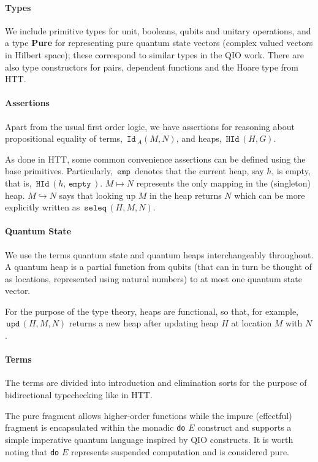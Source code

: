 \documentclass[acmsmall,nonacm,timestamp,review=false,anonymous=false]{acmart}
\newcommand{\type}[1]{\textrm{\textbf{#1}}}
\newcommand{\kw}[1]{\,\mathrm{\texttt{#1}}\,}
\begin{document}
\paragraph{Types} We include primitive types for unit, booleans, qubits and unitary operations, and a type \type{Pure} for representing pure quantum state vectors (complex valued vectors in Hilbert space); these correspond to similar types in the QIO work. There are also type constructors for pairs, dependent functions and the Hoare type from HTT.

\paragraph{Assertions}
Apart from the usual first order logic, we have assertions for reasoning about propositional equality of terms, $\kw{Id}_A(M, N)$, and heaps, $\kw{HId}(H, G)$.

As done in HTT, some common convenience assertions can be defined using the base primitives. Particularly, $\kw{emp}$ denotes that the current heap, say $h$, is empty, that is, $\kw{HId}(h, \kw{empty})$. $M \mapsto N$ represents the only mapping in the (singleton) heap. $M \hookrightarrow N$ says that looking up $M$ in the heap returns $N$ which can be more explicitly written as $\kw{seleq}(H, M, N)$.

\paragraph{Quantum State}

We use the terms quantum state and quantum heaps interchangeably throughout. A quantum heap is a partial function from qubits (that can in turn be thought of as locations, represented using natural numbers) to at most one quantum state vector.

For the purpose of the type theory, heaps are functional, so that, for example, $\kw{upd}(H, M, N)$ returns a new heap after updating heap $H$ at location $M$ with $N$.

\paragraph{Terms}
The terms are divided into introduction and elimination sorts for the purpose of bidirectional typechecking like in HTT.

The pure fragment allows higher-order functions while the impure (effectful) fragment is encapsulated within the monadic \texttt{do} $E$ construct and supports a simple imperative quantum language inspired by QIO constructs. It is worth noting that \texttt{do} $E$ represents suspended computation and is considered pure.
\end{document}
